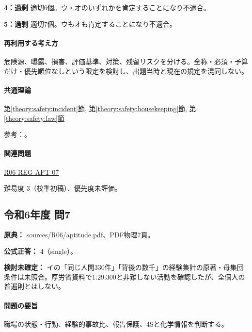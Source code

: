 \noindent\textbf{4：過剰} 適切6個。ウ・オのいずれかを肯定することになり不適合。\par

\noindent\textbf{5：過剰} 適切7個。ウもオも肯定することになり不適合。\par

\paragraph{再利用する考え方} 危険源、曝露、損害、評価基準、対策、残留リスクを分ける。全称・必須・予算だけ・優先順位なしという限定を検討し、出題当時と現在の規定を混同しない。

\paragraph{共通理論} \hyperref[theory:safety:incident]{第\ref*{theory:safety:incident}節}, \hyperref[theory:safety:housekeeping]{第\ref*{theory:safety:housekeeping}節}, \hyperref[theory:safety:law]{第\ref*{theory:safety:law}節}

\par 参考：\cite{saf_welfare,saf_4s,saf_chemqa,saf_healthreport}。

\paragraph{関連問題} \hyperref[q:r06-reg-apt-07]{R06-REG-APT-07}

\par 難易度 3（校準初稿）、優先度未評価。

\subsection{令和6年度 問7}
\label{q:r06-reg-apt-07}

\noindent\textbf{原典：} sources/R06/aptitude.pdf、PDF物理7頁。

\textbf{公式正答：} 4（single）。

\par\textbf{検討未確定：} イの「同じ人間330件」「背後の数千」の経験集計の原著・母集団条件は未照合。厚労省資料で1:29:300と非難しない活動を確認したが、全個人の普遍則とはしない。

\paragraph{問題の要旨} 職場の状態・行動、経験的事故比、報告保護、4Sと化学情報を判断する。


